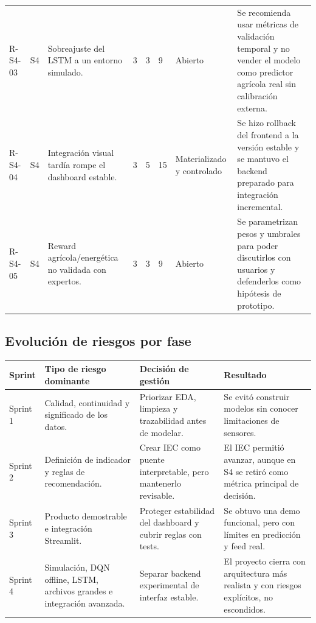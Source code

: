 \documentclass[11pt,a4paper]{article}
\begin{document}
\begin{landscape}
\begin{longtable}{p{1.6cm}p{1.4cm}p{5.2cm}p{0.8cm}p{0.8cm}p{1cm}p{2.6cm}p{6.8cm}}
R-S4-03 & S4 & Sobreajuste del LSTM a un entorno simulado. & 3 & 3 & 9 & Abierto & Se recomienda usar métricas de validación temporal y no vender el modelo como predictor agrícola real sin calibración externa. \\
R-S4-04 & S4 & Integración visual tardía rompe el dashboard estable. & 3 & 5 & 15 & Materializado y controlado & Se hizo rollback del frontend a la versión estable y se mantuvo el backend preparado para integración incremental. \\
R-S4-05 & S4 & Reward agrícola/energética no validada con expertos. & 3 & 3 & 9 & Abierto & Se parametrizan pesos y umbrales para poder discutirlos con usuarios y defenderlos como hipótesis de prototipo. \\
\bottomrule
\end{longtable}
\end{landscape}

\subsection{Evolución de riesgos por fase}

\begin{table}[H]
\centering
\begin{tabular}{p{2cm}p{4cm}p{4.5cm}p{4.2cm}}
\toprule
\textbf{Sprint} & \textbf{Tipo de riesgo dominante} & \textbf{Decisión de gestión} & \textbf{Resultado} \\
\midrule
Sprint 1 & Calidad, continuidad y significado de los datos. & Priorizar EDA, limpieza y trazabilidad antes de modelar. & Se evitó construir modelos sin conocer limitaciones de sensores. \\
Sprint 2 & Definición de indicador y reglas de recomendación. & Crear IEC como puente interpretable, pero mantenerlo revisable. & El IEC permitió avanzar, aunque en S4 se retiró como métrica principal de decisión. \\
Sprint 3 & Producto demostrable e integración Streamlit. & Proteger estabilidad del dashboard y cubrir reglas con tests. & Se obtuvo una demo funcional, pero con límites en predicción y feed real. \\
Sprint 4 & Simulación, DQN offline, LSTM, archivos grandes e integración avanzada. & Separar backend experimental de interfaz estable. & El proyecto cierra con arquitectura más realista y con riesgos explícitos, no escondidos. \\
\bottomrule
\end{tabular}
\end{table}
\end{document}
